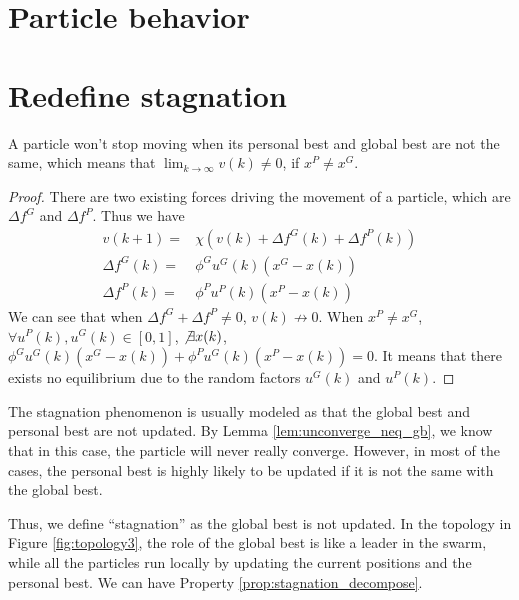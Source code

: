 \section{Particle behavior}
\label{sec:particle_behavior}

\section{Redefine stagnation}
\label{sec:redefine_stagnation}

\begin{lemma}
\label{lem:unconverge_neq_gb}
A particle won't stop moving when its personal best and global best are not the same, 
which means that 
$ \lim_{k \rightarrow \infty} v(k) \neq 0 $, if $ x^{P} \neq x^{G} $.
\begin{proof} 
There are two existing forces driving the movement of a particle, which are $ \Delta f^{G} $ and $ \Delta f^{P} $.
Thus we have
\begin{equation}
\begin{array}{lcl}
v(k+1) = & \chi ( v(k) + \Delta f^{G} (k) + \Delta f^{P} (k) ) \\
\Delta f^{G} (k) = & \phi^{G} u^{G} (k) (x^{G} - x(k)) \\
\Delta f^{P} (k) = & \phi^{P} u^{P} (k) (x^{P} - x(k)) 
\end{array}
\end{equation}
We can see that when $ \Delta f^{G} + \Delta f^{P} \neq 0 $, $ v(k)  \not \rightarrow 0 $.
When $ x^{P} \neq x^{G} $, $ \forall u^{P}(k), u^{G}(k) \in [0, 1] $, $ \not \exists x(k) $, $ \phi^{G} u^{G} (k) (x^{G} - x(k)) + \phi^{P} u^{G} (k) (x^{P} - x(k)) = 0 $.
It means that there exists no equilibrium due to the random factors $ u^{G} (k) $ and $ u^{P} (k) $. 
\end{proof}
\end{lemma}

The stagnation phenomenon is usually modeled as that the global best and personal best are not updated.
By Lemma \ref{lem:unconverge_neq_gb}, we know that in this case, the particle will never really converge.
However, in most of the cases, the personal best is highly likely to be updated if it is not the same with the global best.

Thus, we define ``stagnation'' as the global best is not updated.
In the topology in Figure \ref{fig:topology3}, the role of the global best is like a leader in the swarm, while all the particles run locally by updating the current positions and the personal best.
We can have Property \ref{prop:stagnation_decompose}.

